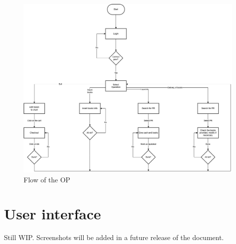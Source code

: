 \begin{figure}[ht]
    \centering
    \includegraphics[width=\textwidth]{assets/flow_op.png}
    \caption{Flow of the OP}
    \label{fig:flow_op}
\end{figure}

\section{User interface}

Still WIP. Screenshots will be added in a future release of the document.